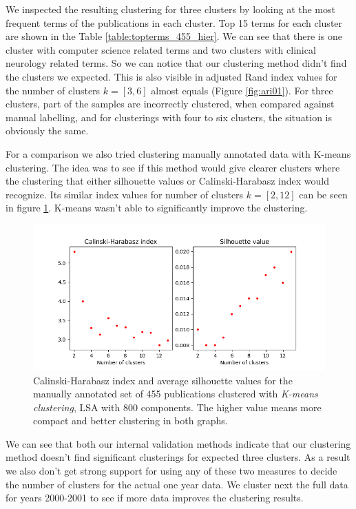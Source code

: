 We inspected the resulting clustering for three clusters by 
looking at the most frequent terms of the publications in each 
cluster. Top 15 terms for each cluster are shown in the Table 
\ref{table:topterms_455_hier}. We can see that there is one cluster
with computer science related terms and two clusters with clinical
neurology related terms. So we can notice that our clustering method
didn't find the clusters we expected. This is also visible in 
adjusted Rand index values for the number of clusters $k=[3,6]$ almost 
equals (Figure \ref{fig:ari01}). For three clusters, part of the 
samples are incorrectly clustered, when compared against manual
labelling, and for clusterings with four to six clusters, the 
situation is obviously the same.



For a comparison we also tried clustering manually annotated data
with K-means clustering. The idea was to see if this method would
give clearer clusters where the clustering that either silhouette values or 
Calinski-Harabasz index would recognize. Its similar
index values for number of clusters $k=[2,12]$ can be seen in 
figure \ref{fig:ch-silh02}. K-means wasn't able to significantly 
improve the clustering.

\begin{figure}[htp]
  \begin{center}    
\includegraphics[width=11.5cm]{images/c-h-silh-index-plot-455-2_12-800-kmeans_ax_fixed.png}
    \caption{Calinski-Harabasz index and average silhouette values for the
    manually annotated set of 455 publications clustered with 
    \emph{K-means clustering}, LSA with 800 components. The higher
    value means more compact and better clustering in both graphs.}
    \label{fig:ch-silh02}
  \end{center}
\end{figure}

We can see that both our internal validation methods indicate that
our clustering method doesn't find significant clusterings for
expected three clusters.
As a result we also don't get strong support for using any of 
these two measures to decide the number of clusters for the actual 
one year data.
We cluster next the full data for years 2000-2001 to see if more 
data improves the clustering results.



